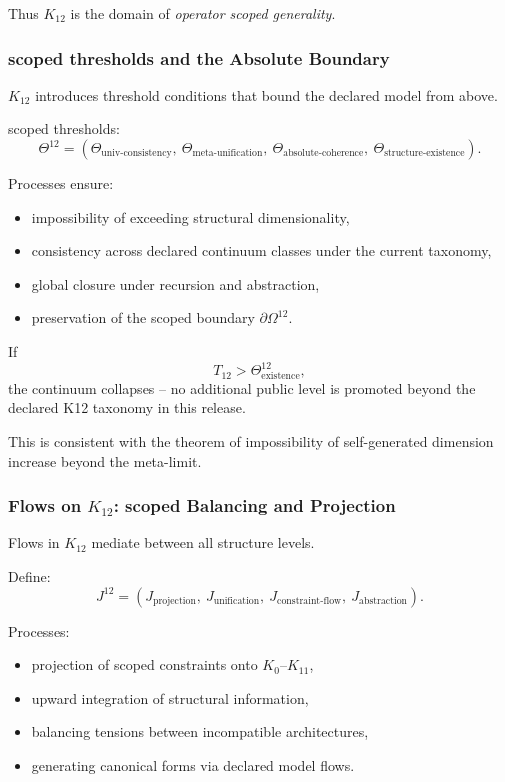 Thus $K_{12}$ is the domain of \emph{operator scoped generality}.

\subsubsection{scoped thresholds and the Absolute Boundary}

$K_{12}$ introduces threshold conditions that bound
the declared model from above.

scoped thresholds:
\[
\Theta^{12} =
(\Theta_{\text{univ-consistency}},\
 \Theta_{\text{meta-unification}},\
 \Theta_{\text{absolute-coherence}},\
 \Theta_{\text{structure-existence}}).
\]

Processes ensure:
\begin{itemize}
    \item impossibility of exceeding structural dimensionality,
    \item consistency across declared continuum classes under the current taxonomy,
    \item global closure under recursion and abstraction,
    \item preservation of the scoped boundary $\partial\Omega^{12}$.
\end{itemize}

If
\[
T_{12} > \Theta^{12}_{\text{existence}},
\]
the continuum collapses -- no additional public level is promoted beyond the declared K12 taxonomy in this release.

This is consistent with the theorem of impossibility of
self-generated dimension increase beyond the meta-limit.

\subsubsection{Flows on $K_{12}$: scoped Balancing and Projection}

Flows in $K_{12}$ mediate between all structure levels.

Define:
\[
J^{12} =
(J_{\text{projection}},\ J_{\text{unification}},\
 J_{\text{constraint-flow}},\ J_{\text{abstraction}}).
\]

Processes:
\begin{itemize}
    \item projection of scoped constraints onto $K_0$--$K_{11}$,
    \item upward integration of structural information,
    \item balancing tensions between incompatible architectures,
    \item generating canonical forms via declared model flows.
\end{itemize}

